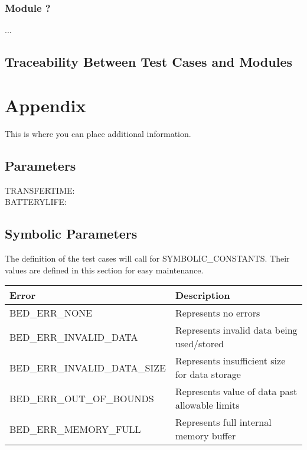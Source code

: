\documentclass[12pt, titlepage]{article}
\begin{document}
\begin{enumerate}
\begin{enumerate}
\end{enumerate}

\subsubsection{Module ?}

...

\subsection{Traceability Between Test Cases and Modules}





%

\newpage

\section{Appendix}

This is where you can place additional information.

\subsection{Parameters}
TRANSFERTIME: \\
BATTERYLIFE: \\

\subsection{Symbolic Parameters}

The definition of the test cases will call for SYMBOLIC\_CONSTANTS.
Their values are defined in this section for easy maintenance.
\begin{flushleft} 
	\begin{table}[H]
		\begin{tabular}{l l} 
			  \toprule		
				  \textbf{Error} & \textbf{Description}\\
				  \midrule 
				  BED\_ERR\_NONE 					& Represents no errors\\
				  BED\_ERR\_INVALID\_DATA			& Represents invalid data being used/stored\\
				  BED\_ERR\_INVALID\_DATA\_SIZE 		& Represents insufficient size for data storage\\
				  BED\_ERR\_OUT\_OF\_BOUNDS 		& Represents value of data past allowable limits\\
				  BED\_ERR\_MEMORY\_FULL 			& Represents full internal memory buffer\\
		

\end{tabular}
\end{table}
\end{flushleft}
\end{enumerate}
\end{document}
